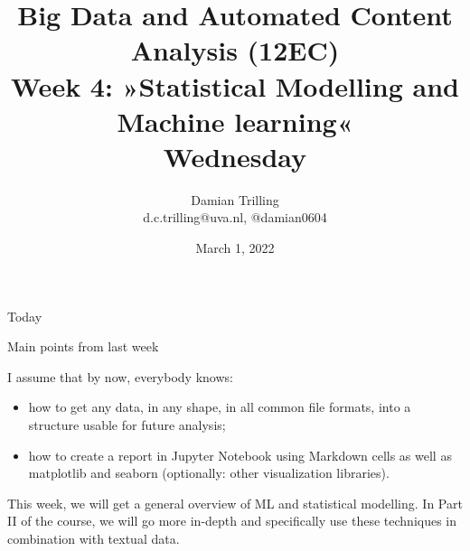 

\graphicspath{{../../resources/img/}}




\title[Big Data and Automated Content Analysis]{\textbf{Big Data and Automated Content Analysis (12EC)} 
\\Week 4: »Statistical Modelling and Machine learning«
\\Wednesday}
\author[Damian Trilling]{Damian Trilling\\ \footnotesize{d.c.trilling@uva.nl, @damian0604 \\}}
\date{March 1, 2022}


\begin{frame}{}
	\titlepage
\end{frame}

\begin{frame}{Today}
	\tableofcontents
\end{frame}





\begin{frame}{Main points from last week}

\begin{alertblock}{I assume that by now, everybody knows:}
\begin{itemize}
\item how to get any data, in any shape, in all common file formats, into a structure usable for future analysis;
\item how to create a report in Jupyter Notebook using Markdown cells as well as matplotlib and seaborn (optionally: other visualization libraries).
\end{itemize}
\end{alertblock}
\end{frame}


\begin{frame}[standout]
This week, we will get a general overview of ML and statistical modelling. In Part II of the course, we will go more in-depth and specifically use these techniques in combination with textual data.
\end{frame}














